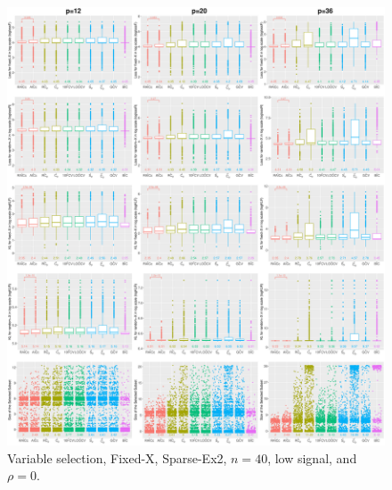 \begin{figure}[!ht]
\centering
\includegraphics[width=\textwidth]{figures/supplement/fixedx/subset_selection/Sparse-Ex2_n40_lsnr_rho0.eps}
\caption{Variable selection, Fixed-X, Sparse-Ex2, $n=40$, low signal, and $\rho=0$.}
\end{figure}
\clearpage
